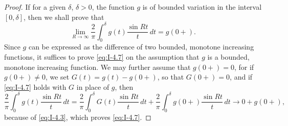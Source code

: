 \begin{proof}
If for a given $\delta$, $\delta>0$, the function $g$ is of bounded variation in the interval $[0,\delta]$, then we shall prove that
\begin{equation}\label{eq:I-4.7}
\lim_{R\to\infty}\frac{2}{\pi}\int_0^\delta g(t)\frac{\sin Rt}{t}\,dt=g(0+).
\end{equation}
Since $g$ can be expressed as the difference of two bounded, monotone increasing functions, it suffices to prove \eqref{eq:I-4.7} on the assumption that $g$ is a bounded, monotone increasing function. We may further assume that $g(0+)=0$, for if $g(0+)\neq 0$, we set $G(t)=g(t)-g(0+)$, so that $G(0+)=0$, and if \eqref{eq:I-4.7} holds with $G$ in place of $g$, then
\begin{equation*}
\frac{2}{\pi}\int_0^\delta g(t)\frac{\sin Rt}{t}\,dt
=\frac{2}{\pi}\int_0^\delta G(t)\frac{\sin Rt}{t}\,dt
+\frac{2}{\pi}\int_0^\delta g(0+)\frac{\sin Rt}{t}\,dt
\to 0+g(0+),
\end{equation*}
because of \eqref{eq:I-4.3}, which proves \eqref{eq:I-4.7}.


\end{proof}
